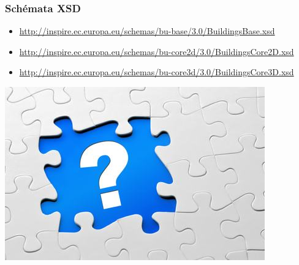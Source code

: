 \begin{frame}
\frametitle{Schémata XSD}
\tiny{
\begin{itemize}
\item \url{http://inspire.ec.europa.eu/schemas/bu-base/3.0/BuildingsBase.xsd}
\item \url{http://inspire.ec.europa.eu/schemas/bu-core2d/3.0/BuildingsCore2D.xsd}
\item \url{http://inspire.ec.europa.eu/schemas/bu-core3d/3.0/BuildingsCore3D.xsd}
\end{itemize}}
\begin{center}
\includegraphics[scale=0.45]{obrazky/missing.jpg}
\end{center}
\end{frame}

